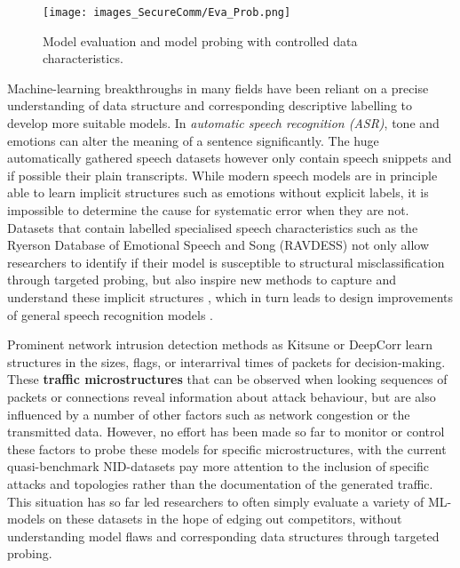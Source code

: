 \begin{figure}
\centering
\texttt{[image: images\_SecureComm/Eva\_Prob.png]}
\caption{Model evaluation and model probing with controlled data characteristics.}\label{Fig:Prob}
\end{figure}

Machine-learning breakthroughs in many fields have been reliant on a precise understanding of data structure and corresponding descriptive labelling to develop more suitable models.
In \textit{automatic speech recognition (ASR)}, tone and emotions can alter the meaning of a sentence significantly. The huge automatically gathered speech datasets however only contain speech snippets and if possible their plain transcripts. While modern speech models are in principle able to learn implicit structures such as emotions without explicit labels, it is impossible to determine the cause for systematic error when they are not. Datasets that contain labelled specialised speech characteristics such as the Ryerson Database of Emotional Speech and Song (RAVDESS) \cite{livingstone2018ryerson} not only allow researchers to identify if their model is susceptible to structural misclassification through targeted probing, but also inspire new methods to capture and understand these implicit structures \cite{haque2019audio}, which in turn leads to design improvements of general speech recognition models \cite{kamper2020multilingual}.



Prominent network intrusion detection methods as Kitsune \cite{mirsky2018kitsune} or DeepCorr \cite{nasr2018deepcorr} learn structures in the sizes, flags, or interarrival times of packets for decision-making. These \textbf{traffic microstructures} that can be observed when looking sequences of packets or connections reveal information about attack behaviour, but are also influenced by a number of other factors such as network congestion or the transmitted data. However, no effort has been made so far to monitor or control these factors to probe these models for specific microstructures, with the current quasi-benchmark NID-datasets pay more attention to the inclusion of specific attacks and topologies rather than the documentation of the generated traffic. 
This situation has so far led researchers to often simply evaluate a variety of ML-models on these datasets in the hope of edging out competitors, without understanding model flaws and corresponding data structures through targeted probing.


